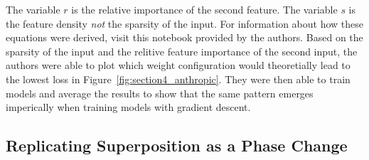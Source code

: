 \documentclass{article} %
\begin{document}
The variable $r$ is the relative importance of the second feature. The variable
$s$ is the feature density \textit{not} the sparsity of the input. For information
about how these equations were derived, visit this notebook provided by the authors.
Based on the sparsity of the input and the relitive feature
importance of the second input, the authors were able to plot which weight configuration
would theoretially lead to the lowest loss in Figure~\ref{fig:section4_anthropic}.
They were then able to train models and average the results to show that the
same pattern emerges imperically when training models with gradient descent.

\subsection{Replicating Superposition as a Phase Change}



\end{document}
